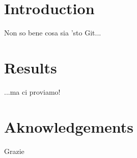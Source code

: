 \documentclass[10pt,twocolumn]{article}
\begin{document}
\section{Introduction}
Non so bene cosa sia 'sto Git...
\section{Results}
...ma ci proviamo!
\section{Aknowledgements}
Grazie
\end{document}
